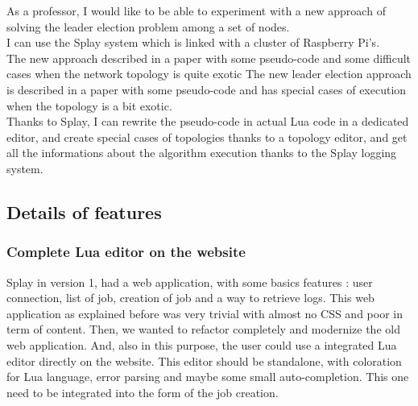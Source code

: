\documentclass{eplmastersthesis}
\begin{document}
          As a professor, I would like to be able to experiment with a new
          approach of solving the leader election problem among a set of
          nodes.\\
          I can use the Splay system which is linked with a cluster of
          Raspberry Pi's.\\
          The new approach described in a paper with some pseudo-code and some difficult
          cases when the network topology is quite exotic
          The new leader election approach is described in a paper with some
          pseudo-code and has special cases of execution when the topology is
          a bit exotic.\\
          Thanks to Splay, I can rewrite the pseudo-code in actual Lua code
          in a dedicated editor, and create special cases of topologies
          thanks to a topology editor, and get all the informations about
          the algorithm execution thanks to the Splay logging system.



      \subsection{Details of features}  %

        \subsubsection{Complete Lua editor on the website}  %

        Splay in version 1, had a web application, with some basics features :
        user connection, list of job, creation of job and a way to retrieve
        logs. This web application as explained before was very trivial with
        almost no CSS and poor in term of content. Then, we wanted to refactor
        completely and modernize the old web application. And, also in this
        purpose, the user could use a integrated Lua editor directly on the
        website. This editor should be standalone, with coloration for Lua
        language, error parsing and maybe some small auto-completion. This one
        need to be integrated into the form of the job creation.
\end{document}
